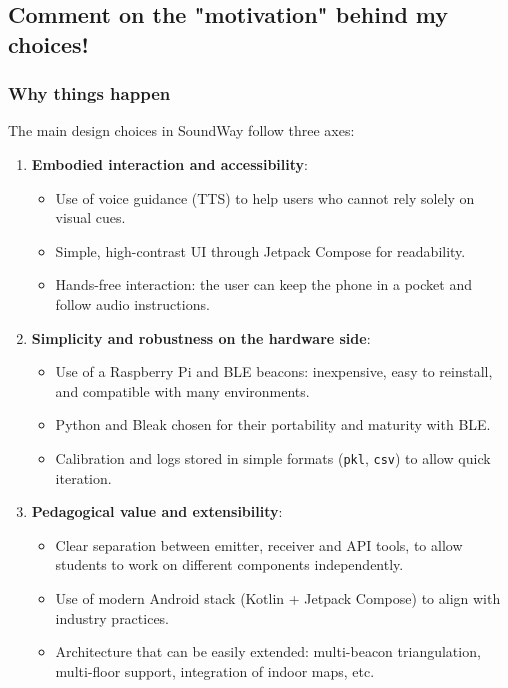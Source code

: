 \documentclass[12pt,a4paper]{article}
\begin{document}
\pagebreak

\subsection{Comment on the "motivation" behind my choices!}

\subsubsection{Why things happen}

The main design choices in SoundWay follow three axes:

\begin{enumerate}
    \item \textbf{Embodied interaction and accessibility}:
    \begin{itemize}
        \item Use of voice guidance (TTS) to help users who cannot rely solely on visual cues.
        \item Simple, high-contrast UI through Jetpack Compose for readability.
        \item Hands-free interaction: the user can keep the phone in a pocket and follow audio instructions.
    \end{itemize}

    \item \textbf{Simplicity and robustness on the hardware side}:
    \begin{itemize}
        \item Use of a Raspberry Pi and BLE beacons: inexpensive, easy to reinstall, and compatible with many environments.
        \item Python and Bleak chosen for their portability and maturity with BLE.
        \item Calibration and logs stored in simple formats (\texttt{pkl}, \texttt{csv}) to allow quick iteration.
    \end{itemize}

    \item \textbf{Pedagogical value and extensibility}:
    \begin{itemize}
        \item Clear separation between emitter, receiver and API tools, to allow students to work on different components independently.
        \item Use of modern Android stack (Kotlin + Jetpack Compose) to align with industry practices.
        \item Architecture that can be easily extended: multi-beacon triangulation, multi-floor support, integration of indoor maps, etc.
    \end{itemize}
\end{enumerate}
\end{document}

